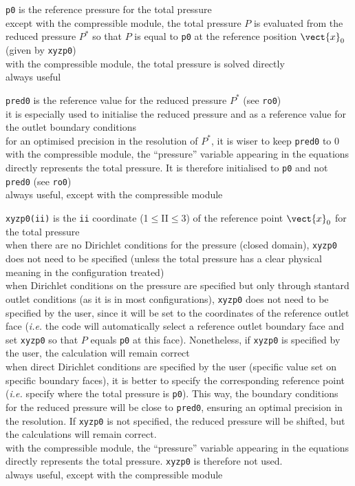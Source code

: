 {{\tt p0} is the reference pressure for the total
pressure\\
except with the compressible module, the total pressure $P$ is evaluated
from the reduced pressure $P^*$ so that $P$
is equal to {\tt p0} at the reference position $\vect{x}_0$ (given by {\tt xyzp0})\\
with the compressible module, the total pressure is solved directly\\
always useful}

{{\tt pred0} is the reference value for the reduced
pressure $P^*$ (see {\tt ro0})\\
it is especially used to initialise the reduced pressure and as a reference
value for the outlet boundary conditions\\
for an optimised precision in the resolution of $P^*$, it is wiser to keep {\tt pred0}
to 0\\
with the compressible module, the ``pressure'' variable appearing in the
equations directly represents the total pressure. It is therefore initialised
to {\tt p0} and not {\tt pred0} (see {\tt ro0})\\
always useful, except with the compressible module}

{{\tt xyzp0(ii)} is the {\tt ii} coordinate
(1$\leqslant$II$\leqslant$3) of the reference point $\vect{x}_0$ for the
total pressure\\
when there are no Dirichlet conditions for the pressure (closed domain), {\tt xyzp0}
does not need to be specified (unless the total pressure has a clear physical
meaning in the configuration treated)\\
when Dirichlet conditions on the pressure are specified but only through stantard
outlet conditions (as it is in most configurations),
{\tt xyzp0} does not need to be specified by the user, since it will be set to the
coordinates of the reference outlet face ({\em i.e.} the code will automatically
select a
reference outlet boundary face and set {\tt xyzp0} so that $P$ equals {\tt p0} at this
face). Nonetheless, if {\tt xyzp0} is specified by the user, the calculation will remain
correct\\
when direct Dirichlet conditions are specified by the user (specific value set
on specific boundary faces), it is better to specify the corresponding reference
point ({\em i.e.} specify where the total pressure is {\tt p0}). This way, the
boundary conditions for the reduced pressure will be close to {\tt pred0}, ensuring an
optimal precision in the resolution. If {\tt xyzp0} is not specified, the reduced
pressure will be shifted, but the calculations will remain correct.\\
with the compressible module, the ``pressure'' variable appearing in the
equations directly represents the total pressure. {\tt xyzp0} is therefore not used.\\
always useful, except with the compressible module}

